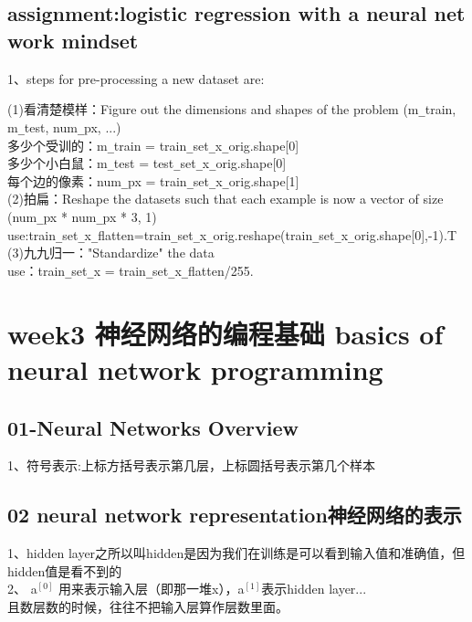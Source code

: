 \documentclass[a4paper,12pt]{article}
\begin{document}
\begin{CJK*}{UTF8}{gbsn}
     \subsection{assignment:logistic regression with a neural net work mindset}
\begin{flushleft}     
      1、steps for pre-processing a new dataset are:

    (1)看清楚模样：Figure out the dimensions and shapes of the problem (m\verb|_|train, m\verb|_|test, num\verb|_|px, ...)\\
\qquad  多少个受训的：m\verb|_|train = train\verb|_|set\verb|_|x\verb|_|orig.shape[0]\\
\qquad  多少个小白鼠：m\verb|_|test = test\verb|_|set\verb|_|x\verb|_|orig.shape[0]\\
\qquad  每个边的像素：num\verb|_|px = train\verb|_|set\verb|_|x\verb|_|orig.shape[1]\\
    (2)拍扁：Reshape the datasets such that each example is now a vector of size (num\verb|_|px * num\verb|_|px * 3, 1)\\
        use:train\verb|_|set\verb|_|x\verb|_|flatten=train\verb|_|set\verb|_|x\verb|_|orig.reshape(train\verb|_|set\verb|_|x\verb|_|orig.shape[0],-1).T\\
    (3)九九归一："Standardize" the data\\
    use：train\verb|_|set\verb|_|x = train\verb|_|set\verb|_|x\verb|_|flatten/255.\\
\end{flushleft}
\section{week3 神经网络的编程基础 basics of neural network programming}
  \subsection{01-Neural Networks Overview}
\begin{flushleft}
1、符号表示:上标方括号表示第几层，上标圆括号表示第几个样本\\
\end{flushleft}
  \subsection{02 neural network representation神经网络的表示}
  1、hidden layer之所以叫hidden是因为我们在训练是可以看到输入值和准确值，但hidden值是看不到的\\
  2、 a$^{[0]}$  用来表示输入层（即那一堆x），a$^{[1]}$表示hidden layer...\\
  且数层数的时候，往往不把输入层算作层数里面。\\

\end{CJK*}
\end{document}
